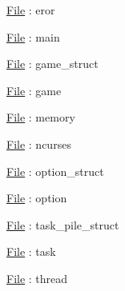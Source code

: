\documentclass[8pt,a4paper]{article}
\begin{document}
\underline{File} : eror


\underline{File} : main


\underline{File} : game\_struct

\underline{File} : game



\underline{File} : memory



\underline{File} : ncurses



\underline{File} : option\_struct


\underline{File} : option



\underline{File} : task\_pile\_struct

\underline{File} : task



\underline{File} : thread



\end{document}
